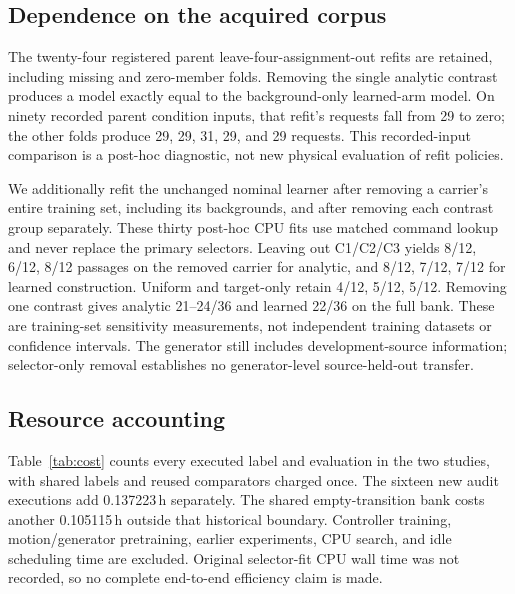 \documentclass[letterpaper,10pt,conference]{ieeeconf}
\begin{document}
\subsection{Dependence on the acquired corpus}
The twenty-four registered parent leave-four-assignment-out refits are
retained, including missing and zero-member folds. Removing the single
analytic contrast produces a model exactly equal to the background-only
learned-arm model. On ninety recorded parent condition inputs, that refit's
requests fall from 29 to zero; the other folds produce 29, 29, 31, 29,
and 29 requests. This recorded-input comparison is a post-hoc diagnostic,
not new physical evaluation of refit policies.

We additionally refit the unchanged nominal learner after removing a
carrier's entire training set, including its backgrounds, and after
removing each contrast group separately. These thirty post-hoc CPU fits
use matched command lookup and never replace the primary selectors.
Leaving out C1/C2/C3 yields 8/12, 6/12, 8/12 passages on the removed
carrier for analytic, and 8/12, 7/12, 7/12 for learned construction.
Uniform and target-only retain 4/12, 5/12, 5/12. Removing one contrast
gives analytic 21--24/36 and learned 22/36 on the full bank. These are
training-set sensitivity measurements, not independent training datasets
or confidence intervals. The generator still includes development-source
information; selector-only removal establishes no generator-level
source-held-out transfer.

\subsection{Resource accounting}
\begin{table}[t]
\centering\small
\caption{Measured rollout-process time, including startup and contention.
The first four rows sum to 6.577196\,h (the historical ``6.6 GPU-hour''
boundary). This is not GPU utilization time or total method training cost.}

\label{tab:cost}
\end{table}
Table~\ref{tab:cost} counts every executed label and evaluation in the two
studies, with shared labels and reused comparators charged once. The
sixteen new audit executions add 0.137223\,h separately. The shared
empty-transition bank costs another 0.105115\,h outside that historical
boundary. Controller training, motion/generator pretraining, earlier
experiments, CPU search, and idle scheduling time are excluded. Original
selector-fit CPU wall time was not recorded, so no complete end-to-end
efficiency claim is made.
\end{document}
